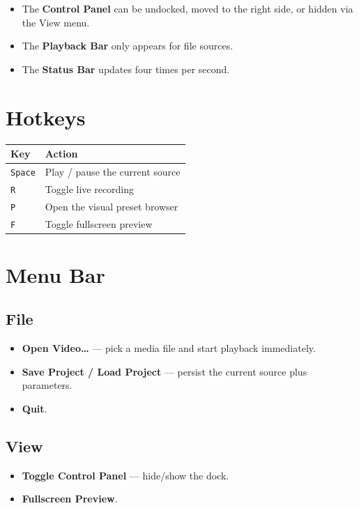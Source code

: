 \documentclass[11pt,a4paper,openany]{report}
\begin{document}
\begin{itemize}
    \item The \textbf{Control Panel} can be undocked, moved to the right
        side, or hidden via the View menu.
    \item The \textbf{Playback Bar} only appears for file sources.
    \item The \textbf{Status Bar} updates four times per second.
\end{itemize}

\section{Hotkeys}

\begin{tabularx}{\linewidth}{@{}lX@{}}
    \toprule
    \textbf{Key} & \textbf{Action} \\
    \midrule
    \texttt{Space} & Play / pause the current source \\
    \texttt{R} & Toggle live recording \\
    \texttt{P} & Open the visual preset browser \\
    \texttt{F} & Toggle fullscreen preview \\
    \bottomrule
\end{tabularx}

\section{Menu Bar}

\subsection{File}
\begin{itemize}
    \item \textbf{Open Video\ldots} --- pick a media file and start playback immediately.
    \item \textbf{Save Project / Load Project} --- persist the current source plus parameters.
    \item \textbf{Quit}.
\end{itemize}

\subsection{View}
\begin{itemize}
    \item \textbf{Toggle Control Panel} --- hide/show the dock.
    \item \textbf{Fullscreen Preview}.
\end{itemize}
\end{document}

